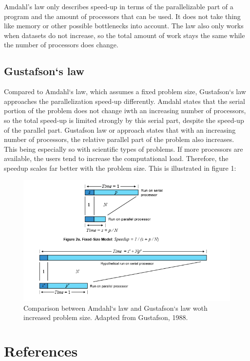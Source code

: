\documentclass[a4paper]{article}
\begin{document}
Amdahl's law only describes speed-up in terms of the parallelizable part of a program and the amount of processors that can be used. It does not take thing like memory or other possible bottlenecks into account. The law also only works when datasets do not increase, so the total amount of work stays the same while the number of processors does change.

\subsection{Gustafson`s law}
Compared to Amdahl`s law, which assumes a fixed problem size, Gustafson`s law approaches the parallelization speed-up differently. Amdahl states that the serial portion of the problem does not change iwth an increasing number of processors, so the total speed-up is limited strongly by this serial part, despite the speed-up of the parallel part.
Gustafson law or approach states that with an increasing number of processors, the relative parallel part of the problem also increases. This being especially so with scientific types of problems. If more processors are available, the users tend to increase the computational load. Therefore, the speedup scales far better with the problem size. This is illustrated in figure 1:

\begin{figure}[-ht]
\includegraphics[width=\textwidth]{Law}
\caption{Comparison between Amdahl`s law and Gustafson`s law woth increased problem size. Adapted from Gustafson, 1988.}
\end{figure}

\section{References}
\end{document}
